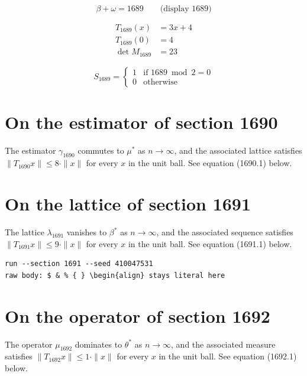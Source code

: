 \documentclass{article}
\begin{document}
$$
\beta + \omega = 1689 \qquad \text{(display 1689)}
$$

\begin{align}
T_{1689}(x) &= 3 x + 4 \\
T_{1689}(0) &= 4 \\
\det M_{1689} &= 23
\end{align}

\begin{equation}
S_{1689} = \begin{cases} 1 & \text{if } 1689 \bmod 2 = 0 \\ 0 & \text{otherwise} \end{cases}
\end{equation}

\section{On the estimator of section 1690}
The estimator $\gamma_{1690}$ commutes to $\mu^{*}$ as $n \to \infty$,
and the associated lattice satisfies $\|T_{1690} x\| \leq 8 \cdot \|x\|$
for every $x$ in the unit ball. See equation (1690.1) below.

\section{On the lattice of section 1691}
The lattice $\lambda_{1691}$ vanishes to $\beta^{*}$ as $n \to \infty$,
and the associated sequence satisfies $\|T_{1691} x\| \leq 9 \cdot \|x\|$
for every $x$ in the unit ball. See equation (1691.1) below.

\begin{verbatim}
run --section 1691 --seed 410047531
raw body: $ & % { } \begin{align} stays literal here
\end{verbatim}

\section{On the operator of section 1692}
The operator $\mu_{1692}$ dominates to $\theta^{*}$ as $n \to \infty$,
and the associated measure satisfies $\|T_{1692} x\| \leq 1 \cdot \|x\|$
for every $x$ in the unit ball. See equation (1692.1) below.
\end{document}
